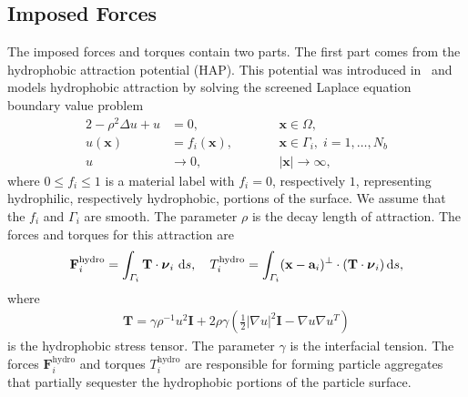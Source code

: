 \documentclass[lineno]{jfm}
\renewcommand{\aa}{\mathbf{a}}
\newcommand{\FF}{\mathbf{F}}
\newcommand{\nnu}{\boldsymbol{\nu}}
\newcommand{\xx}{\mathbf{x}}
\begin{document}
\subsection{Imposed Forces}
The imposed forces and torques contain two parts. The first part comes
from the hydrophobic attraction potential (HAP). This potential was
introduced in~\cite{Fu20} and models hydrophobic attraction by solving
the screened Laplace equation boundary value problem
\begin{alignat}{2}
  \label{eq:SL}
-\rho^2 \Delta u + u &=0,            && \xx \in \Omega,\\
\label{eq:SLbc}
u(\xx) &= f_i(\xx),\qquad  && \xx \in \Gamma_i,\; i=1,\ldots,N_b \\
\label{eq:SLff}
u &\to 0,                          &&|\xx| \to \infty,
\end{alignat}
where $0 \leq f_i \leq 1$ is a material label with $f_i = 0$, respectively $1$, representing
hydrophilic, respectively hydrophobic, portions of the surface.  We assume that the $f_i$ and $\Gamma_i$ are
smooth.  The parameter $\rho$ is the
decay length of attraction. The forces and torques for this attraction
are 
\begin{align}
  \label{eq:hydrophobicAttraction}
  \FF_i^{\text{hydro}} = \int_{\Gamma_i} {\bf T}\cdot \nnu_i \, \dif s, 
    \quad 
  T_i^{\text{hydro}} = \int_{\Gamma_i} (\xx - \aa_i)^{\perp} \cdot ({\bf T} \cdot \nnu_i) \dif s,
\end{align}
where
\begin{align}
  \label{eq:stress}
\mathbf{T}
= \gamma\rho^{-1}u^2 \mathbf{I} + 2\rho\gamma \left(\tfrac{1}{2}|\nabla
  u|^2 \mathbf{I} - \nabla u  \nabla u^T\right)
\end{align}
is the hydrophobic stress tensor. The parameter $\gamma$ is
the interfacial
tension. The forces $\FF_i^{\text{hydro}}$ and torques
$T_i^{\text{hydro}}$ are responsible for forming particle aggregates
that partially sequester the hydrophobic portions of the particle
surface.
\end{document}
